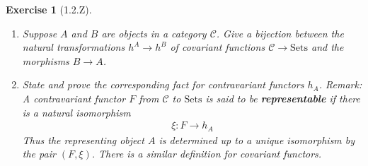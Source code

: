 \documentclass{amsart}
\newtheorem*{exercise*}{Exercise}
\begin{document}
\begin{exercise*}[1.2.Z]
    \begin{enumerate}
        \item[(a)] Suppose $A$ and $B$ are objects in a category $\mathscr{C}$. Give a bijection between the natural transformations $h^A\rightarrow h^B$ of covariant functions $\mathscr{C}\rightarrow \mathrm{Sets}$ and the morphisms $B\rightarrow A$. 

        \item[(b)] State and prove the corresponding fact for contravariant functors $h_A$. Remark: A contravariant functor $F$ from $\mathscr{C}$ to $\mathrm{Sets}$ is said to be \textbf{representable} if there is a natural isomorphism
        \begin{align*}
            \xi: F\rightarrow h_A
        \end{align*}
        Thus the representing object $A$ is determined up to a unique isomorphism by the pair $(F, \xi)$. There is a similar definition for covariant functors. 
    \end{enumerate}
\end{exercise*}

\vspace{0.1in}
\end{document}
